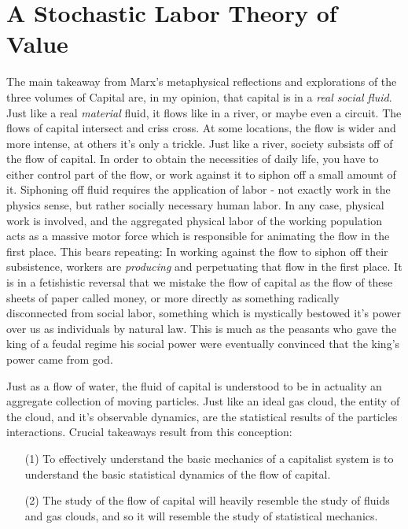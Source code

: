 \section{A Stochastic Labor Theory of Value}
The main takeaway from Marx's metaphysical reflections and explorations of the three volumes of Capital are, in my opinion, that capital is in a \emph{real social fluid}. 
Just like a real \emph{material} fluid, it flows like in a river, or maybe even a circuit. The flows of capital intersect and criss cross. At some locations, the flow is wider and more intense, at others it's only a trickle. Just like a river, society subsists off of the flow of capital. In order to obtain the necessities of daily life, you have to either control part of the flow, or work against it to siphon off a small amount of it. Siphoning off fluid requires the application of labor - not exactly work in the physics sense, but rather socially necessary human labor. In any case, physical work is involved, and the aggregated physical labor of the working population acts as a massive motor force which is responsible for animating the flow in the first place. This bears repeating: In working against the flow to siphon off their subsistence, workers are \emph{producing} and perpetuating that flow in the first place. It is in a fetishistic reversal that we mistake the flow of capital as the flow of these sheets of paper called money, or more directly as something radically disconnected from social labor, something which is mystically bestowed it's power over us as individuals by natural law. This is much as the peasants who gave the king of a feudal regime his social power were eventually convinced that the king's power came from god. \par 
Just as a flow of water, the fluid of capital is understood to be in actuality an aggregate collection of moving particles. Just like an ideal gas cloud, the entity of the cloud, and it's observable dynamics, are the statistical results of the particles interactions. Crucial takeaways result from this conception:
\begin{itemize}
	\item[(1)] To effectively understand the basic mechanics of a capitalist system is to understand the basic statistical dynamics of the flow of capital.
	\item[(2)] The study of the flow of capital will heavily resemble the study of fluids and gas clouds, and so it will resemble the study of statistical mechanics.
\end{itemize}
